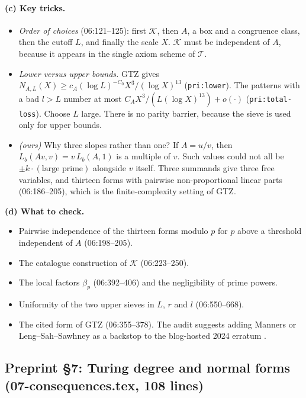\documentclass[11pt]{article}
\theoremstyle{definition}
\newcommand{\Kmult}{\mathcal K}
\newcommand{\lbl}[1]{\texttt{#1}}
\newcommand{\src}[1]{\textsf{#1}}
\newcommand{\checkhead}{\par\smallskip\noindent\textbf{(d) What to check.}\ }
\begin{document}
\paragraph{(c) Key tricks.}
\begin{itemize}
\item \emph{Order of choices} (\src{06:121--125}): first $\Kmult$, then
$A$, a box and a congruence class, then the cutoff $L$, and finally the
scale $X$.  $\Kmult$ must be independent of $A$, because it appears in the
single axiom scheme of $\mathcal T$.
\item \emph{Lower versus upper bounds.}  GTZ gives
$N_{A,L}(X)\ge c_A(\log L)^{-C_0}X^3/(\log X)^{13}$ (\lbl{pri:lower}).  The
patterns with a bad $l>L$ number at most $C_AX^3/(L(\log X)^{13})+o(\cdot)$
(\lbl{pri:total-loss}).  Choose $L$ large.  There is no parity barrier,
because the sieve is used only for upper bounds.
\item \emph{(ours)} Why three slopes rather than one?  If $A=u/v$, then
$L_b(Av,v)=v\,L_b(A,1)$ is a multiple of $v$.  Such values could not all
be $\pm k\cdot(\text{large prime})$ alongside $v$ itself.  Three summands
give three free variables, and thirteen forms with pairwise
non-proportional linear parts (\src{06:186--205}), which is the
finite-complexity setting of GTZ.
\end{itemize}

\checkhead
\begin{itemize}
\item Pairwise independence of the thirteen forms modulo $p$ for $p$ above
a threshold independent of $A$ (\src{06:198--205}).
\item The catalogue construction of $\Kmult$ (\src{06:223--250}).
\item The local factors $\beta_p$ (\src{06:392--406}) and the negligibility
of prime powers.
\item Uniformity of the two upper sieves in $L$, $r$ and $l$
(\src{06:550--668}).
\item The cited form of GTZ (\src{06:355--378}).  The audit suggests adding
Manners or Leng--Sah--Sawhney as a backstop to the blog-hosted 2024
erratum \cite{GreenTaoZiegler2024Erratum}.
\end{itemize}

\subsection{Preprint \S7: Turing degree and normal forms (\src{07-consequences.tex}, 108 lines)}
\end{document}
